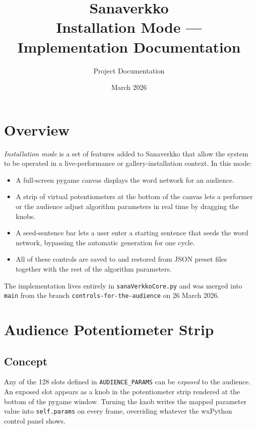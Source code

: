 \documentclass[11pt,a4paper]{report}
\title{Sanaverkko \\ \large Installation Mode --- Implementation Documentation}
\author{Project Documentation}
\date{March 2026}
\begin{document}
\maketitle
\tableofcontents

\chapter{Overview}

\textit{Installation mode} is a set of features added to Sanaverkko that
allow the system to be operated in a live-performance or gallery-installation
context.  In this mode:

\begin{itemize}
  \item A full-screen pygame canvas displays the word network for an audience.
  \item A strip of virtual potentiometers at the bottom of the canvas lets a
        performer or the audience adjust algorithm parameters in real time by
        dragging the knobs.
  \item A seed-sentence bar lets a user enter a starting sentence that seeds
        the word network, bypassing the automatic generation for one cycle.
  \item All of these controls are saved to and restored from JSON preset files
        together with the rest of the algorithm parameters.
\end{itemize}

The implementation lives entirely in \texttt{sanaVerkkoCore.py} and was
merged into \texttt{main} from the branch
\texttt{controls-for-the-audience} on 26 March 2026.

\chapter{Audience Potentiometer Strip}

\section{Concept}

Any of the 128 slots defined in \texttt{AUDIENCE\_PARAMS} can be
\emph{exposed} to the audience.  An exposed slot appears as a knob in the
potentiometer strip rendered at the bottom of the pygame window.  Turning the
knob writes the mapped parameter value into \texttt{self.params} on every
frame, overriding whatever the wxPython control panel shows.
\end{document}
